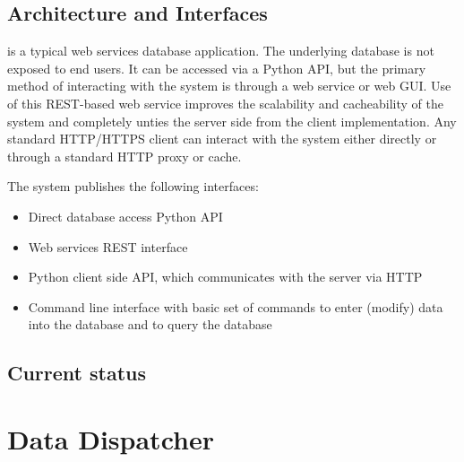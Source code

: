 \documentclass[../main-v1.tex]{subfiles}
\begin{document}
\subsection{Architecture and Interfaces}
 is a typical web services database application. The underlying database is not exposed to end users. It can be accessed via a Python API, but the primary method of interacting with the system is through a web service or web GUI. Use of this REST-based web service improves the scalability and cacheability of the system and completely unties the server side from the client implementation. Any standard HTTP/HTTPS client can interact with the system either directly or through a standard HTTP proxy or cache. 


The system publishes the following interfaces: 
\begin{itemize} 
\item Direct database access Python API 

\item Web services REST interface 

\item Python client side API, which communicates with the server via HTTP 

\item 
Command line interface with basic set of commands to enter (modify) data into the database and to query the database 
\end{itemize}


\subsection{Current status} 




\section{Data Dispatcher }
\end{document}
